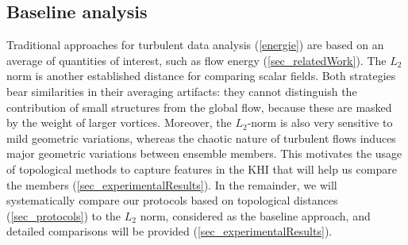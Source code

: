 \subsection{Baseline analysis}
Traditional approaches for turbulent data analysis (\autoref{energie}) are based on an average of
quantities of interest, such as flow energy (\autoref{sec_relatedWork}).
The $L_2$ norm is another established distance for comparing scalar fields. Both strategies bear similarities in their averaging artifacts: they cannot distinguish the contribution
of small structures from the global flow, because these are masked by the weight
of larger vortices.
%
Moreover, the $L_2$-norm is also very sensitive to mild geometric variations,
whereas the chaotic nature of turbulent flows induces major geometric
variations between ensemble members.
This motivates the usage of  topological methods to capture
features in the KHI that will help us compare the members
(\autoref{sec_experimentalResults}). In the remainder, we will systematically compare our protocols based on topological distances (\autoref{sec_protocols}) to the $L_2$ norm, considered as the baseline approach, and detailed comparisons will be provided (\autoref{sec_experimentalResults}).
